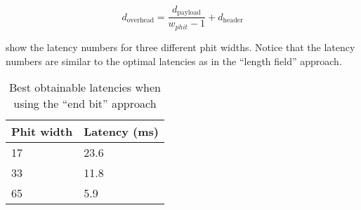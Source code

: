 \begin{equation}
    d_{\text{overhead}} = \frac{d_{\text{payload}}}{w_{phit} - 1} + d_{\text{header}}
\label{eq:end_bit_overhead}
\end{equation}

 show the latency numbers for three different phit widths.
Notice that the latency numbers are similar to the optimal latencies as in the ``length field'' approach. 

\begin{table}[hbtp]
\centering
\begin{tabular}{@{}ll@{}}
\toprule
\textbf{Phit width} & \textbf{Latency (ms)} \\ \midrule
17        & 23.6                  \\
33        & 11.8                  \\
65        & 5.9                   \\ \bottomrule
\end{tabular}
\caption{Best obtainable latencies when using the ``end bit'' approach}
\label{tab:end_bit_latency}
\end{table}

